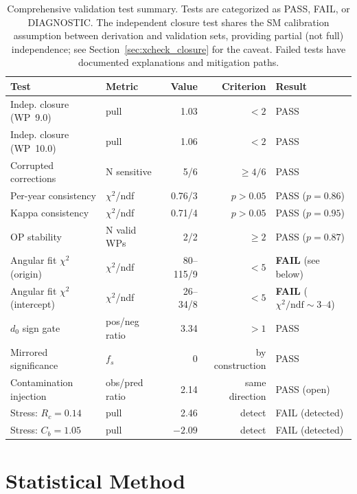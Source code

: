 \documentclass[11pt,a4paper]{article}
\begin{document}
\begin{table}[htbp]
\centering
\caption{Comprehensive validation test summary. Tests are categorized as PASS, FAIL,
or DIAGNOSTIC. The independent closure test shares the SM calibration assumption
between derivation and validation sets, providing partial (not full) independence;
see Section~\ref{sec:xcheck_closure} for the caveat.
Failed tests have documented explanations and mitigation paths.}
\label{tab:validation_summary}
\small
\begin{tabular}{llrrl}
\toprule
Test & Metric & Value & Criterion & Result \\
\midrule
Indep. closure (WP~9.0) & pull & 1.03 & $< 2$ & PASS \\
Indep. closure (WP~10.0) & pull & 1.06 & $< 2$ & PASS \\
Corrupted corrections & N sensitive & 5/6 & $\geq 4/6$ & PASS \\
Per-year consistency & $\chi^2$/ndf & 0.76/3 & $p > 0.05$ & PASS ($p = 0.86$) \\
Kappa consistency & $\chi^2$/ndf & 0.71/4 & $p > 0.05$ & PASS ($p = 0.95$) \\
OP stability & N valid WPs & 2/2 & $\geq 2$ & PASS ($p = 0.87$) \\
Angular fit $\chi^2$ (origin) & $\chi^2$/ndf & 80--115/9 & $< 5$ & \textbf{FAIL} (see below) \\
Angular fit $\chi^2$ (intercept) & $\chi^2$/ndf & 26--34/8 & $< 5$ & \textbf{FAIL} ($\chi^2/\mathrm{ndf} \sim 3$--$4$) \\
$d_0$ sign gate & pos/neg ratio & 3.34 & $> 1$ & PASS \\
Mirrored significance & $f_s$ & 0 & by construction & PASS \\
Contamination injection & obs/pred ratio & 2.14 & same direction & PASS (open) \\
Stress: $R_c = 0.14$ & pull & 2.46 & detect & FAIL (detected) \\
Stress: $C_b = 1.05$ & pull & $-2.09$ & detect & FAIL (detected) \\
\bottomrule
\end{tabular}
\end{table}

\FloatBarrier
{}
\section{Statistical Method}
\label{sec:statmethod}
\end{document}
